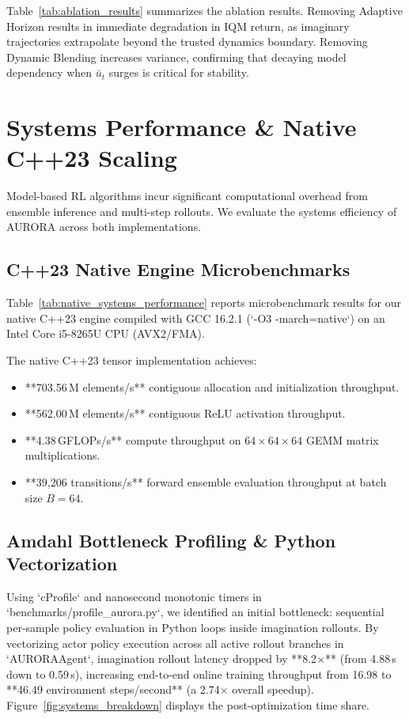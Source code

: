 \documentclass[11pt,a4paper]{article}
\theoremstyle{definition}
\theoremstyle{remark}
\begin{document}


Table~\ref{tab:ablation_results} summarizes the ablation results. Removing Adaptive Horizon results in immediate degradation in IQM return, as imaginary trajectories extrapolate beyond the trusted dynamics boundary. Removing Dynamic Blending increases variance, confirming that decaying model dependency when $\bar{u}_t$ surges is critical for stability.

\section{Systems Performance \& Native C++23 Scaling}
\label{sec:systems}

Model-based RL algorithms incur significant computational overhead from ensemble inference and multi-step rollouts. We evaluate the systems efficiency of AURORA across both implementations.

\subsection{C++23 Native Engine Microbenchmarks}

Table~\ref{tab:native_systems_performance} reports microbenchmark results for our native C++23 engine compiled with GCC 16.2.1 (`-O3 -march=native`) on an Intel Core i5-8265U CPU (AVX2/FMA).



The native C++23 tensor implementation achieves:
\begin{itemize}
    \item **703.56\,M elements/s** contiguous allocation and initialization throughput.
    \item **562.00\,M elements/s** contiguous ReLU activation throughput.
    \item **4.38\,GFLOPs/s** compute throughput on $64 \times 64 \times 64$ GEMM matrix multiplications.
    \item **39,206 transitions/s** forward ensemble evaluation throughput at batch size $B=64$.
\end{itemize}

\subsection{Amdahl Bottleneck Profiling \& Python Vectorization}

Using `cProfile` and nanosecond monotonic timers in `benchmarks/profile_aurora.py`, we identified an initial bottleneck: sequential per-sample policy evaluation in Python loops inside imagination rollouts. By vectorizing actor policy execution across all active rollout branches in `AURORAAgent`, imagination rollout latency dropped by **8.2$\times$** (from 4.88\,s down to 0.59\,s), increasing end-to-end online training throughput from 16.98 to **46.49 environment steps/second** (a 2.74$\times$ overall speedup). Figure~\ref{fig:systems_breakdown} displays the post-optimization time share.
\end{document}
